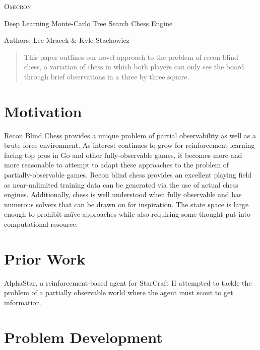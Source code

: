 \documentclass{IEEEtran}
\begin{document}
\begin{titlepage}
    \centering
    {\scshape\Huge Omicron \par \vspace{1cm}
    }
    {\Large Deep Learning Monte-Carlo Tree Search Chess Engine\par}
    {\vfill}
    {\LARGE Authors: Lee Mracek \& Kyle Stachowicz}
\end{titlepage}
\begin{abstract}
    This paper outlines our novel approach to the problem of recon blind chess,
    a variation of chess in which both players can only see the board through
    brief observations in a three by three square.
\end{abstract}
\section{Motivation}
Recon Blind Chess provides a unique problem of partial observability as well as
a brute force environment. As interest continues to grow for reinforcement
learning facing top pros in Go and other fully-observable games, it becomes more
and more reasonable to attempt to adapt these approaches to the problem of
partially-observable games. Recon blind chess provides an excellent playing
field as near-unlimited training data can be generated via the use of actual
chess engines. Additionally, chess is well understood when fully observable and
has numerous solvers that can be drawn on for inspiration. The state space is
large enough to prohibit na\"ive approaches while also requiring some thought
put into computational resource.
\section{Prior Work}

AlphaStar, a reinforcement-based agent for StarCraft II attempted to tackle the
problem of a partially observable world where the agent must scout to get
information.

\section{Problem Development}
\end{document}
